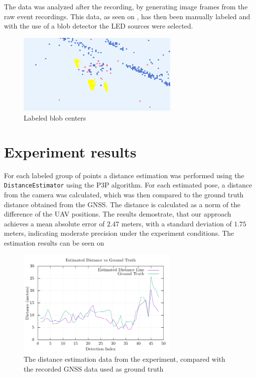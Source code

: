 The data was analyzed after the recording, by generating image frames from the raw event recordings. This data,
as seen on , has then been manually labeled and with the use of a blob detector the \ac{LED} sources
were selected.

\begin{figure}[H]
	\centering
	\includegraphics[width=0.7\textwidth]{./fig/photos/labeled_2.png}
	\caption{Labeled blob centers}
	\label{fig:labeled}
\end{figure}

\section{Experiment results}

For each labeled group of points a distance estimation was performed using the \texttt{DistanceEstimator} using the
\ac{P3P} algorithm. For each estimated pose, a distance from the camera was calculated, which was then compared to the
ground truth distance obtained from the \ac{GNSS}. The distance is calculated as a norm of the difference of the \ac{UAV} positions.
The results demostrate, that our approach achieves a mean absolute error of $2.47$ meters, with a standard deviation of $1.75$ meters,
indicating moderate precision under the experiment conditions.
The estimation
results can be seen on 

\begin{figure}[H]
	\centering
	\includegraphics[width=0.7\textwidth]{./fig/tikz/experiment_analysis.pdf}
	\caption{The distance estimation data from the experiment, compared with the recorded GNSS data used as ground truth}
	\label{fig:experiment_results}
\end{figure}

